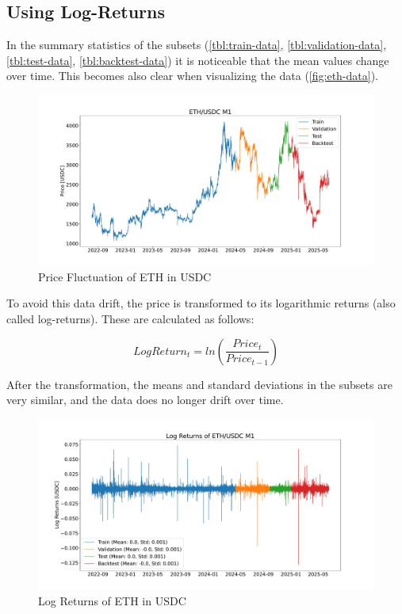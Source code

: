 \subsection{Using Log-Returns}

In the summary statistics of the subsets (\autoref{tbl:train-data}, \autoref{tbl:validation-data}, \autoref{tbl:test-data}, \autoref{tbl:backtest-data}) it is noticeable that the mean values change over time.
This becomes also clear when visualizing the data (\autoref{fig:eth-data}).

\begin{figure}[H]
    \centering
    \includegraphics[width=\textwidth]{images/eda/ethusdc_price}
    \caption{Price Fluctuation of ETH in USDC}
    \label{fig:eth-data}
\end{figure}

To avoid this data drift, the price is transformed to its logarithmic returns (also called log-returns).
These are calculated as follows:

\begin{equation}
    LogReturn_t = ln(\frac{Price_t}{Price_{t-1}})
\end{equation}

After the transformation, the means and standard deviations in the subsets are very similar, and the data does no longer drift over time.

\begin{figure}[H]
    \centering
    \includegraphics[width=\textwidth]{images/eda/log_returns_ethusdc}
    \caption{Log Returns of ETH in USDC}
    \label{fig:eth-log-data}
\end{figure}

